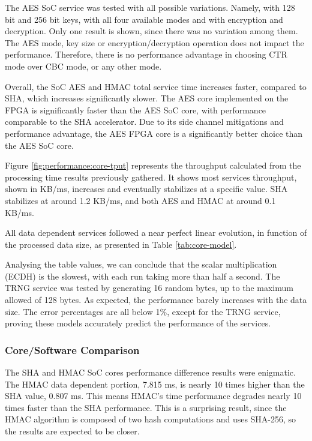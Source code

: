 The AES SoC service was tested with all possible variations. Namely, with 128 bit and 256 bit keys, with all four available modes and with encryption and decryption. Only one result is shown, since there was no variation among them. The AES mode, key size or encryption/decryption operation does not impact the performance. Therefore, there is no performance advantage in choosing CTR mode over CBC mode, or any other mode.

Overall, the SoC AES and HMAC total service time increases faster, compared to SHA, which increases significantly slower.
The AES core implemented on the FPGA is significantly faster than the AES SoC core, with performance comparable to the SHA accelerator. Due to its side channel mitigations and performance advantage, the AES FPGA core is a significantly better choice than the AES SoC core.

Figure \ref{fig:performance:core-tput} represents the throughput calculated from the processing time results previously gathered. It shows most services throughput, shown in KB/ms, increases and eventually stabilizes at a specific value. SHA stabilizes at around 1.2 KB/ms, and both AES and HMAC at around 0.1 KB/ms.

All data dependent services followed a near perfect linear evolution, in function of the processed data size, as presented in Table \ref{tab:core-model}.

Analysing the table values, we can conclude that the scalar multiplication (ECDH) is the slowest, with each run taking more than half a second.
The TRNG service was tested by generating 16 random bytes, up to the maximum allowed of 128 bytes. As expected, the performance barely increases with the data size.
The error percentages are all below 1\%, except for the TRNG service, proving these models accurately predict the performance of the services.

\subsubsection*{Core/Software Comparison}\label{chap:evaluation:services:software}

The SHA and HMAC SoC cores performance difference results were enigmatic. The HMAC data dependent portion, 7.815 ms, is nearly 10 times higher than the SHA value, 0.807 ms. This means HMAC's time performance degrades nearly 10 times faster than the SHA performance. This is a surprising result, since the HMAC algorithm is composed of two hash computations and uses SHA-256, so the results are expected to be closer.

